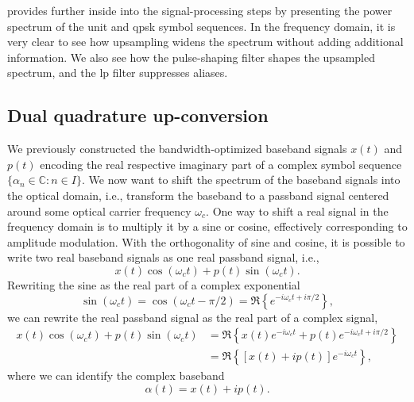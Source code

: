  provides further inside into the signal-processing steps by presenting the power spectrum of the unit and \gls{qpsk} symbol sequences.
In the frequency domain, it is very clear to see how upsampling widens the spectrum without adding additional information.
We also see how the pulse-shaping filter shapes the upsampled spectrum, and the \gls{lp} filter suppresses aliases.

\FloatBarrier
\subsection{Dual quadrature up-conversion}

We previously constructed the bandwidth-optimized baseband signals $x(t)$ and $p(t)$ encoding the real respective imaginary part of a complex symbol sequence $\{\alpha_n\in\mathbb{C}\colon n\in I\}$.
We now want to shift the spectrum of the baseband signals into the optical domain, i.e., transform the baseband to a passband signal centered around some optical carrier frequency $\omega_c$.
One way to shift a real signal in the frequency domain is to multiply it by a sine or cosine, effectively corresponding to amplitude modulation.
With the orthogonality of sine and cosine, it is possible to write two real baseband signals as one real passband signal, i.e.,
\begin{equation}
	x(t)
	\cos(\omega_ct)
	+
	p(t)
	\sin(\omega_ct)
	.
\end{equation}
Rewriting the sine as the real part of a complex exponential
\begin{equation}
	\sin(\omega_ct)
	=
	\cos(\omega_c t-\pi/2)
	=
	\Re\left\{e^{-i\omega_c t+i\pi/2}\right\}
	,
\end{equation}
we can rewrite the real passband signal as the real part of a complex signal,
\begin{equation}
	\begin{split}
		x(t)
		\cos(\omega_ct)
		+
		p(t)
		\sin(\omega_ct)
		&=
		\Re\left\{
			x(t)
			e^{-i\omega_ct}
			+
			p(t)
			e^{-i\omega_ct+i\pi/2}
		\right\}
		\\
		&=
		\Re\left\{
			\left[
				x(t)
				+
				ip(t)
			\right]
			e^{-i\omega_ct}
		\right\}
		,
	\end{split}
	\label{eq:real_complex_passband}
\end{equation}
where we can identify the complex baseband
\begin{equation}
	\alpha(t)
	=
	x(t)
	+
	ip(t)
	.
\end{equation}
